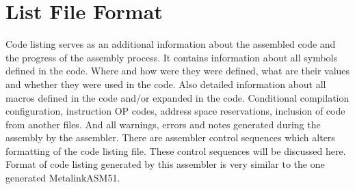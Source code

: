 \documentclass[a4paper,twoside,12pt]{book}
\begin{document}
	\section{List File Format}
		Code listing serves as an additional information about the assembled code and the progress of the assembly process. It contains information about all symbols defined in the code. Where and how were they were defined, what are their values and whether they were used in the code. Also detailed information about all macros defined in the code and/or expanded in the code. Conditional compilation configuration, instruction OP codes, address space reservations, inclusion of code from another files. And all warnings, errors and notes generated during the assembly by the assembler. There are assembler control sequences which alters formatting of the code listing file. These control sequences will be discussed here. Format of code listing generated by this assembler is very similar to the one generated Metalink\textregistered ASM51.
\end{document}
